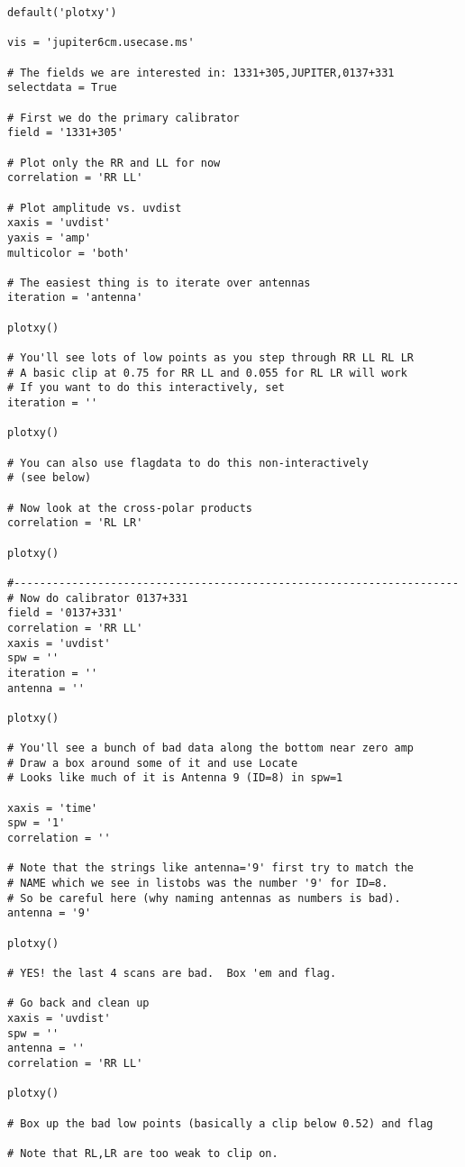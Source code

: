 \small
\begin{verbatim}
default('plotxy')

vis = 'jupiter6cm.usecase.ms'

# The fields we are interested in: 1331+305,JUPITER,0137+331
selectdata = True

# First we do the primary calibrator
field = '1331+305'

# Plot only the RR and LL for now
correlation = 'RR LL'

# Plot amplitude vs. uvdist
xaxis = 'uvdist'
yaxis = 'amp'
multicolor = 'both'

# The easiest thing is to iterate over antennas
iteration = 'antenna'

plotxy()

# You'll see lots of low points as you step through RR LL RL LR
# A basic clip at 0.75 for RR LL and 0.055 for RL LR will work
# If you want to do this interactively, set
iteration = ''

plotxy()

# You can also use flagdata to do this non-interactively
# (see below)

# Now look at the cross-polar products
correlation = 'RL LR'

plotxy()

#---------------------------------------------------------------------
# Now do calibrator 0137+331
field = '0137+331'
correlation = 'RR LL'
xaxis = 'uvdist'
spw = ''
iteration = ''
antenna = ''

plotxy()

# You'll see a bunch of bad data along the bottom near zero amp
# Draw a box around some of it and use Locate
# Looks like much of it is Antenna 9 (ID=8) in spw=1

xaxis = 'time'
spw = '1'
correlation = ''

# Note that the strings like antenna='9' first try to match the 
# NAME which we see in listobs was the number '9' for ID=8.
# So be careful here (why naming antennas as numbers is bad).
antenna = '9'

plotxy()

# YES! the last 4 scans are bad.  Box 'em and flag.

# Go back and clean up
xaxis = 'uvdist'
spw = ''
antenna = ''
correlation = 'RR LL'

plotxy()

# Box up the bad low points (basically a clip below 0.52) and flag

# Note that RL,LR are too weak to clip on.


\end{verbatim}
